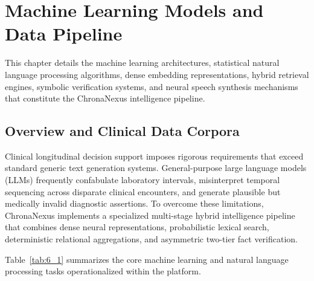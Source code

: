 \chapter{Machine Learning Models and Data Pipeline}
\label{chap:ml_data}

This chapter details the machine learning architectures, statistical natural language processing algorithms, dense embedding representations, hybrid retrieval engines, symbolic verification systems, and neural speech synthesis mechanisms that constitute the ChronaNexus intelligence pipeline.

\section{Overview and Clinical Data Corpora}

Clinical longitudinal decision support imposes rigorous requirements that exceed standard generic text generation systems. General-purpose large language models (LLMs) frequently confabulate laboratory intervals, misinterpret temporal sequencing across disparate clinical encounters, and generate plausible but medically invalid diagnostic assertions. To overcome these limitations, ChronaNexus implements a specialized multi-stage hybrid intelligence pipeline that combines dense neural representations, probabilistic lexical search, deterministic relational aggregations, and asymmetric two-tier fact verification.

Table~\ref{tab:6_1} summarizes the core machine learning and natural language processing tasks operationalized within the platform.

